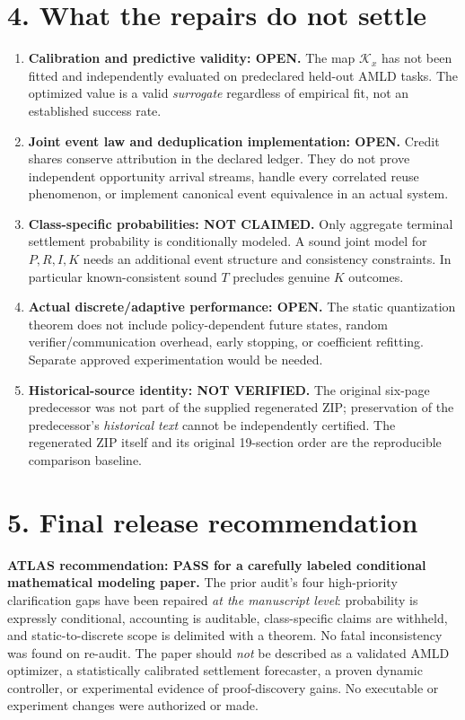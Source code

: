 \documentclass[10pt,letterpaper]{article}
\begin{document}
\section*{4. What the repairs do not settle}
\begin{enumerate}[label=\textbf{R\arabic*.},leftmargin=2.6em,itemsep=3pt]
\item \textbf{Calibration and predictive validity: OPEN.} The map $\mathcal K_x$ has not been fitted and independently evaluated on predeclared held-out AMLD tasks. The optimized value is a valid \emph{surrogate} regardless of empirical fit, not an established success rate.
\item \textbf{Joint event law and deduplication implementation: OPEN.} Credit shares conserve attribution in the declared ledger. They do not prove independent opportunity arrival streams, handle every correlated reuse phenomenon, or implement canonical event equivalence in an actual system.
\item \textbf{Class-specific probabilities: NOT CLAIMED.} Only aggregate terminal settlement probability is conditionally modeled. A sound joint model for $P,R,I,K$ needs an additional event structure and consistency constraints. In particular known-consistent sound $T$ precludes genuine $K$ outcomes.
\item \textbf{Actual discrete/adaptive performance: OPEN.} The static quantization theorem does not include policy-dependent future states, random verifier/communication overhead, early stopping, or coefficient refitting. Separate approved experimentation would be needed.
\item \textbf{Historical-source identity: NOT VERIFIED.} The original six-page predecessor was not part of the supplied regenerated ZIP; preservation of the predecessor's \emph{historical text} cannot be independently certified. The regenerated ZIP itself and its original 19-section order are the reproducible comparison baseline.
\end{enumerate}

\section*{5. Final release recommendation}
\textbf{ATLAS recommendation: PASS for a carefully labeled conditional mathematical modeling paper.} The prior audit's four high-priority clarification gaps have been repaired \emph{at the manuscript level}: probability is expressly conditional, accounting is auditable, class-specific claims are withheld, and static-to-discrete scope is delimited with a theorem. No fatal inconsistency was found on re-audit. The paper should \emph{not} be described as a validated AMLD optimizer, a statistically calibrated settlement forecaster, a proven dynamic controller, or experimental evidence of proof-discovery gains. No executable or experiment changes were authorized or made.
\end{document}
